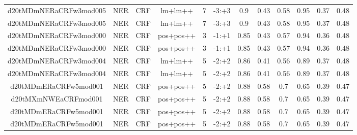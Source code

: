 \documentclass[a4paper]{article}
\begin{document}
\begin{landscape}
\begin{center}
\begin{tabular}{ |c|c|c|c|c|c|c|c|c|c|c|c|}
 
 	
 	\small{ d20tMDmNERaCRFw3mod005 } & \small{ NER} & \small{  CRF }  & lm+lm++  &  7 &  \small{  -3:+3 }  &  0.9 & 0.43 & 0.58  &  0.95 & 0.37 & 0.48 \\
 	

 
 	
 	\small{ d20tMDmNERaCRFw3mod005 } & \small{ NER} & \small{  CRF }  & lm+lm++  &  7 &  \small{  -3:+3 }  &  0.9 & 0.43 & 0.58  &  0.95 & 0.37 & 0.48 \\
 	

 
 	
 	\small{ d20tMDmNERaCRFw3mod000 } & \small{ NER} & \small{  CRF }  & pos+pos++  &  3 &  \small{  -1:+1 }  &  0.85 & 0.43 & 0.57  &  0.94 & 0.36 & 0.48 \\
 	

 
 	
 	\small{ d20tMDmNERaCRFw3mod000 } & \small{ NER} & \small{  CRF }  & pos+pos++  &  3 &  \small{  -1:+1 }  &  0.85 & 0.43 & 0.57  &  0.94 & 0.36 & 0.48 \\
 	

 
 	
 	\small{ d20tMDmNERaCRFw3mod004 } & \small{ NER} & \small{  CRF }  & lm+lm++  &  5 &  \small{  -2:+2 }  &  0.86 & 0.41 & 0.56  &  0.89 & 0.37 & 0.48 \\
 	

 
 	
 	\small{ d20tMDmNERaCRFw3mod004 } & \small{ NER} & \small{  CRF }  & lm+lm++  &  5 &  \small{  -2:+2 }  &  0.86 & 0.41 & 0.56  &  0.89 & 0.37 & 0.48 \\
 	

 
 	
 	\small{ d20tMDmERaCRFw5mod001 } & \small{ NER} & \small{  CRF }  & pos+pos++  &  5 &  \small{  -2:+2 }  &  0.88 & 0.58 & 0.7  &  0.65 & 0.39 & 0.47 \\
 	

 
 	
 	\small{ d20tMXmNWEaCRFmod001 } & \small{ NER} & \small{  CRF }  & pos+pos++  &  5 &  \small{  -2:+2 }  &  0.88 & 0.58 & 0.7  &  0.65 & 0.39 & 0.47 \\
 	

 
 	
 	\small{ d20tMDmERaCRFw5mod001 } & \small{ NER} & \small{  CRF }  & pos+pos++  &  5 &  \small{  -2:+2 }  &  0.88 & 0.58 & 0.7  &  0.65 & 0.39 & 0.47 \\
 	

 
 	
 	\small{ d20tMDmERaCRFw5mod001 } & \small{ NER} & \small{  CRF }  & pos+pos++  &  5 &  \small{  -2:+2 }  &  0.88 & 0.58 & 0.7  &  0.65 & 0.39 & 0.47 \\
 	


\end{tabular}
\end{center}
\end{landscape}
\end{document}

